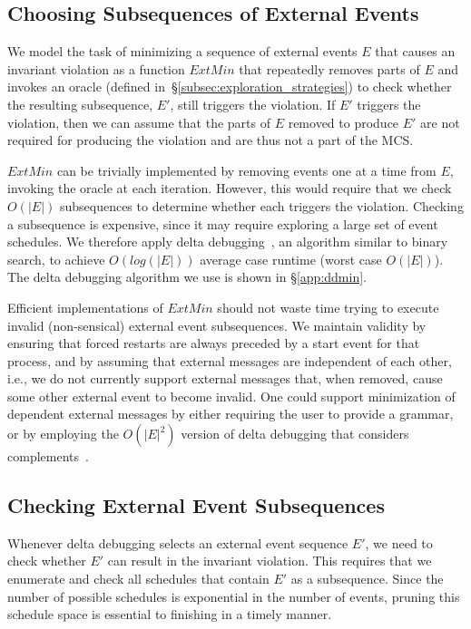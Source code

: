 \subsection{Choosing Subsequences of External Events}

We model the task of minimizing a sequence of external events $E$ that causes an invariant violation
as a function $ExtMin$ that repeatedly removes parts of $E$ and invokes an
oracle (defined in~\S\ref{subsec:exploration_strategies})
to check whether the resulting subsequence, $E'$, still triggers the violation. If $E'$ triggers the
violation, then we can assume that the parts of $E$ removed to produce $E'$ are not required
for producing the violation and are thus not a part of the MCS.

$ExtMin$ can be trivially implemented by removing events one at a time
from $E$, invoking the oracle at each iteration. However, this would require that we check
$O(|E|)$ subsequences to determine whether each triggers the violation.
Checking a subsequence
is expensive, since it may require exploring a large set of event schedules.
We therefore apply
delta debugging~\cite{Zeller:1999:YMP:318773.318946,Zeller:2002:SIF:506201.506206}, an algorithm similar to
binary search, to achieve $O(log(|E|))$ average case runtime (worst case
$O(|E|)$). The delta debugging algorithm we use is shown in
\S\ref{app:ddmin}.

Efficient implementations of $ExtMin$ should not waste time trying to execute invalid
(non-sensical) external event subsequences. We maintain validity by
ensuring that forced restarts are always preceded by a start
event for that process, and by assuming that external
messages are independent of each other, i.e., we do not currently support external messages that, when removed, cause some
other external event to become invalid. One could support minimization of
dependent external messages by either requiring the user to provide a grammar,
or by employing the $O(|E|^2)$ version of delta debugging that considers
complements~\cite{Zeller:2002:SIF:506201.506206}.

\subsection{Checking External Event Subsequences}

Whenever delta debugging selects an external event sequence $E'$, we need to check
whether $E'$ can result in the invariant violation. This requires that we enumerate
and check all schedules that contain $E'$ as a subsequence.
Since the number of possible schedules is exponential in the number of events,
pruning this schedule space is essential to finishing in a timely manner.

